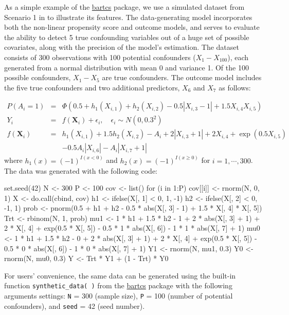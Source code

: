 As a simple example of the \href{https://CRAN.R-project.org/package=bartcs}{bartcs} package, we use a simulated dataset from Scenario 1 in \cite{kim2023bnp} to illustrate its features. The data-generating model incorporates both the non-linear propensity score and outcome models, and serves to evaluate the ability to detect 5 true confounding variables out of a huge set of possible covariates, along with the precision of the model's estimation. The dataset consists of 300 observations with 100 potential confounders ($X_1 - X_{100}$), each generated from a normal distribution with mean 0 and variance 1. Of the 100 possible confounders, $X_1 - X_5$ are true confounders. The outcome model includes the five true confounders and two additional predictors, $X_6$ and $X_7$ as follows:


\begin{eqnarray*}
P(A_i=1) &=& \Phi(0.5+h_1(X_{i,1}) + h_2(X_{i,2}) - 0.5 |X_{i,3}-1| +1.5 X_{i,4} X_{i,5})\\
Y_i & = & f(\boldsymbol{X}_i) + \epsilon_i, \quad \epsilon_i \sim N(0, 0.3^2) \\
f(\boldsymbol{X}_i) & = & h_1(X_{i,1}) + 1. 5 h_2(X_{i,2}) - A_i + 2 |X_{i,3}+1| + 2 X_{i,4} + \exp(0.5 X_{i,5}) \\
& & - 0.5 A_i |X_{i,6}| - A_i |X_{i,7}+1|
\end{eqnarray*}
%
where $h_1(x) = (-1)^{I(x<0)}$ and $h_2(x) = (-1)^{I(x\geq0)}$ for $i=1, \cdots, 300$.
The data was generated with the following code:

\begin{example}
set.seed(42)
N <- 300
P <- 100
cov <- list()
for (i in 1:P) {
     cov[[i]] <- rnorm(N, 0, 1)
   }
X <- do.call(cbind, cov)
h1 <- ifelse(X[, 1] < 0, 1, -1)
h2 <- ifelse(X[, 2] < 0, -1, 1)
prob <- pnorm(0.5 + h1 + h2 - 0.5 * abs(X[, 3] - 1) + 1.5 * X[, 4] * X[, 5])
Trt <- rbinom(N, 1, prob) 
mu1 <- 1 * h1 + 1.5 * h2 - 1 + 2 * abs(X[, 3] + 1) + 2 * X[, 4] + exp(0.5 * X[, 5]) - 
     0.5 * 1 * abs(X[, 6]) - 1 * 1 * abs(X[, 7] + 1)
mu0 <- 1 * h1 + 1.5 * h2 - 0 + 2 * abs(X[, 3] + 1) + 2 * X[, 4] + exp(0.5 * X[, 5]) - 
     0.5 * 0 * abs(X[, 6]) - 1 * 0 * abs(X[, 7] + 1)
Y1 <- rnorm(N, mu1, 0.3)
Y0 <- rnorm(N, mu0, 0.3)
Y <- Trt * Y1 + (1 - Trt) * Y0
\end{example}
For users' convenience, the same data can be generated using the built-in function \verb|synthetic_data( )| from the \href{https://CRAN.R-project.org/package=bartcs}{bartcs} package with the  following arguments settings: \verb|N| = 300 (sample size), \verb|P| = 100 (number of potential confounders), and \verb|seed| = 42 (seed number).

